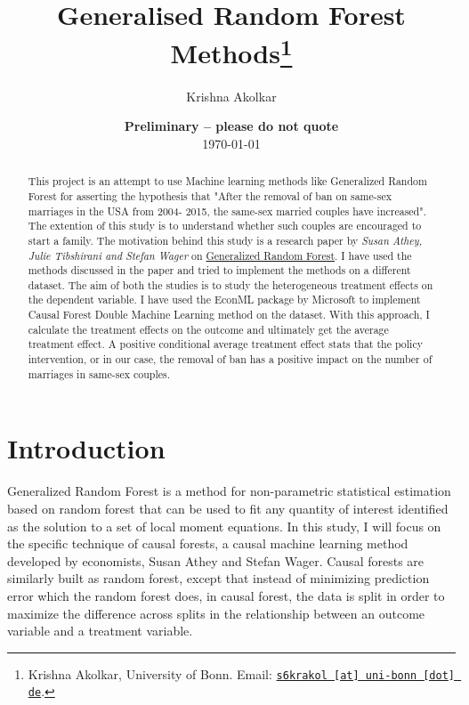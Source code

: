 \documentclass[11pt, a4paper, leqno]{article}
\begin{document}
\title{Generalised Random Forest Methods\thanks{Krishna Akolkar, University of Bonn. Email: \href{mailto:s6krakol@uni-bonn.de}{\nolinkurl{s6krakol [at] uni-bonn [dot] de}}.}}

\author{Krishna Akolkar}

\date{
    {\bf Preliminary -- please do not quote}
    \\[1ex]
    \today
}

\maketitle


\begin{abstract}
    This project is an attempt to use Machine learning methods like Generalized Random Forest for asserting the hypothesis that
    "After the removal of ban on same-sex marriages in the USA from 2004- 2015, the same-sex married couples have increased".
    The extention of this study is to understand whether such couples are encouraged to start a family. The motivation behind this 
    study is a research paper by \textit{Susan Athey, Julie Tibshirani and Stefan Wager} on
     \href{https://arxiv.org/pdf/1610.01271}{Generalized Random Forest}. I have used the methods discussed in the paper and tried 
    to implement the methods on a different dataset. The aim of both the studies is to study the heterogeneous treatment effects on 
    the dependent variable. I have used the EconML package by Microsoft to implement Causal Forest Double Machine Learning method on 
    the dataset. With this approach, I calculate the treatment effects on the outcome and ultimately get the average treatment effect. 
    A positive conditional average treatment effect stats that the policy intervention, or in our case, the removal of ban has a positive 
    impact on the number of marriages in same-sex couples.
\end{abstract}

\clearpage


\section{Introduction} %
\label{sec:introduction}

 Generalized Random Forest is a method for non-parametric statistical estimation based on random forest that can be used to fit any quantity 
 of interest identified as the solution to a set of local moment equations. In this study, I will focus on the specific technique of causal 
 forests, a causal machine learning method developed by economists, Susan Athey and Stefan Wager. Causal forests are similarly built as random 
 forest, except that instead of minimizing prediction error which the random forest does, in causal forest, the data is split in order to 
 maximize the difference across splits in the relationship between an outcome variable and a treatment variable. 
\end{document}
